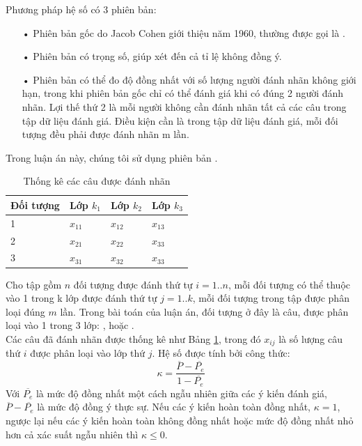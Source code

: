 Phương pháp hệ số  có 3 phiên bản:
\begin{itemize}
\item[•] Phiên bản gốc do Jacob Cohen giới thiệu năm 1960, thường được gọi là .
\item[•] Phiên bản  có trọng số, giúp xét đến cả tỉ lệ không đồng ý.
\item[•] Phiên bản  có thể đo độ đồng nhất với số lượng người đánh nhãn không giới hạn, trong khi phiên bản gốc chỉ có thể đánh giá khi có đúng 2 người đánh nhãn. Lợi thế thứ 2 là mỗi người không cần đánh nhãn tất cả các câu trong tập dữ liệu đánh giá. Điều kiện cần là trong tập dữ liệu đánh giá, mỗi đối tượng đều phải được đánh nhãn m lần.
\end{itemize}
Trong luận án này, chúng tôi sử dụng phiên bản .
\begin{table}[t]
\centering
\caption{Thống kê các câu được đánh nhãn} \label{table:kappa}
\begin{tabular}{| l | l | l | l |}
\hline
\textbf{Đối tượng} & \textbf{Lớp $k_1$} & \textbf{Lớp $k_2$} & \textbf{Lớp $k_3$} \\
\hline
1            & $x_{11}$             & $x_{12}$               & $x_{13}$             \\
\hline
2            & $x_{21}$             & $x_{22}$              & $x_{33}$             \\
\hline
3            & $x_{31}$             & $x_{32}$              & $x_{33}$            \\
\hline
\end{tabular}
\end{table}
Cho tập gồm $n$ đối tượng được đánh thứ tự $i=1..n$, mỗi đối tượng có thể thuộc vào 1 trong k lớp được đánh thứ tự $j=1..k$, mỗi đối tượng trong tập được phân loại đúng $m$ lần. Trong bài toán của luận án, đối tượng ở đây là câu, được phân loại vào 1 trong 3 lớp: \tichcuc, \tieucuc hoặc \trungtinh.\\

 Các câu đã đánh nhãn được thống kê như Bảng \ref{table:kappa}, trong đó $x_{ij}$ là số lượng câu thứ $i$ được phân loại vào lớp thứ $j$.
Hệ số  được tính bởi công thức:
\begin{equation} \label{eq:0}
\kappa = \dfrac{\overline{P} - \overline{P_e}}{1 - \overline{P_e}}
\end{equation}
Với $\overline{P_e}$ là mức độ đồng nhất một cách ngẫu nhiên giữa các ý kiến đánh giá, $\overline{P} - \overline{P_e}$ là mức độ đồng ý thực sự. Nếu các ý kiến hoàn toàn đồng nhất, $\kappa=1$, ngược lại nếu các ý kiến hoàn toàn không đồng nhất hoặc mức độ đồng nhất nhỏ hơn cả xác suất ngẫu nhiên thì $\kappa \leq 0$.\\

